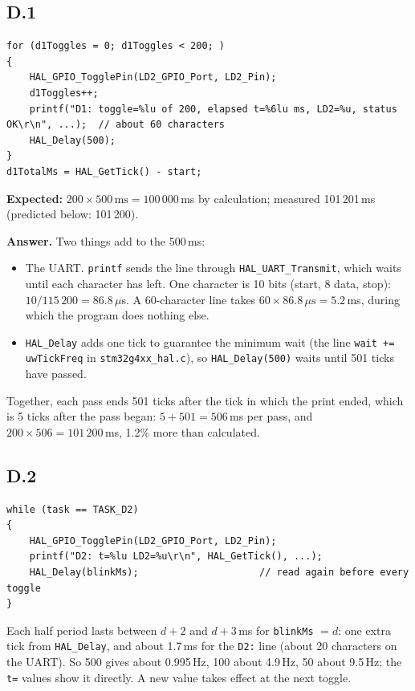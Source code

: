 \documentclass[11pt,a4paper]{article}
\newcommand{\lv}[1]{\texttt{#1}}                 %
\begin{document}
\subsection*{D.1}
\begin{lstlisting}
for (d1Toggles = 0; d1Toggles < 200; )
{
    HAL_GPIO_TogglePin(LD2_GPIO_Port, LD2_Pin);
    d1Toggles++;
    printf("D1: toggle=%lu of 200, elapsed t=%6lu ms, LD2=%u, status OK\r\n", ...);  // about 60 characters
    HAL_Delay(500);
}
d1TotalMs = HAL_GetTick() - start;
\end{lstlisting}
\textbf{Expected:} $200 \times 500\,\text{ms} = 100\,000$\,ms by calculation; measured 101\,201\,ms (predicted below: 101\,200).

\textbf{Answer.} Two things add to the 500\,ms:
\begin{itemize}
  \item The UART. \texttt{printf} sends the line through \texttt{HAL\_UART\_Transmit}, which waits until each character
        has left. One character is 10 bits (start, 8 data, stop): $10 / 115\,200 = 86.8\,\mu$s. A 60-character line
        takes $60 \times 86.8\,\mu\text{s} = 5.2$\,ms, during which the program does nothing else.
  \item \texttt{HAL\_Delay} adds one tick to guarantee the minimum wait (the line \texttt{wait += uwTickFreq}
        in \texttt{stm32g4xx\_hal.c}), so \texttt{HAL\_Delay(500)} waits until 501 ticks have passed.
\end{itemize}
Together, each pass ends 501 ticks after the tick in which the print ended, which is 5 ticks after the pass began:
$5 + 501 = 506$\,ms per pass, and $200 \times 506 = 101\,200$\,ms, 1.2\% more than calculated.

\subsection*{D.2}
\begin{lstlisting}
while (task == TASK_D2)
{
    HAL_GPIO_TogglePin(LD2_GPIO_Port, LD2_Pin);
    printf("D2: t=%lu LD2=%u\r\n", HAL_GetTick(), ...);
    HAL_Delay(blinkMs);                     // read again before every toggle
}
\end{lstlisting}
Each half period lasts between $d + 2$ and $d + 3$\,ms for \lv{blinkMs} $= d$: one extra tick from
\texttt{HAL\_Delay}, and about 1.7\,ms for the \texttt{D2:} line (about 20 characters on the UART). So 500 gives
about 0.995\,Hz, 100 about 4.9\,Hz, 50 about 9.5\,Hz; the \texttt{t=} values show it directly. A new value takes effect at the next
toggle.
\end{document}
